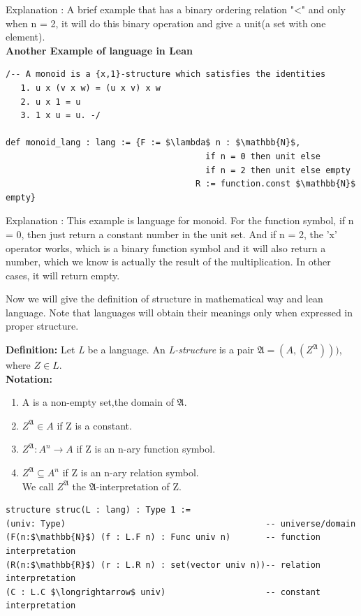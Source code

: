 \documentclass[landscape]{sciposter}
\begin{document}
\begin{multicols}{4}
Explanation : A brief example that has a binary ordering relation "<" and only when n = 2, it will do this binary operation and give a unit(a set with one element).\\

\textbf{Another Example of language in Lean}\\
\begin{lstlisting}
/-- A monoid is a {x,1}-structure which satisfies the identities
   1. u x (v x w) = (u x v) x w
   2. u x 1 = u
   3. 1 x u = u. -/

def monoid_lang : lang := {F := $\lambda$ n : $\mathbb{N}$,
                                        if n = 0 then unit else
                                        if n = 2 then unit else empty
                                      R := function.const $\mathbb{N}$ empty}
\end{lstlisting}
Explanation : This example is language for monoid.  For the function symbol, if n = 0, then just return a constant number in the unit set. And if n = 2, the 'x' operator works, which is a binary function symbol and it will also return a number, which we know is actually the result of the multiplication. In other cases, it will return empty.


Now we will give the definition of structure in mathematical way and
lean language. Note that languages will obtain their meanings only
when expressed in proper structure.

\textbf{Definition:} Let \textit{L} be a language. An \textit{L-structure} is a pair $\mathfrak{A} = (A,(Z^\mathfrak{A})))$, where $Z \in L$. \\
\textbf{Notation:} \begin{enumerate}
    \item    A is a non-empty set,the domain of $\mathfrak{A}$.
    \item    $Z^\mathfrak{A}\in A$ if Z is a constant.
    \item    $Z^\mathfrak{A} : A^n \longrightarrow A$ if Z is an n-ary function symbol.
    \item    $Z^\mathfrak{A} \subseteq A^n$ if Z is an n-ary relation symbol.\\
    We call $Z^\mathfrak{A}$ the $\mathfrak{A}$-interpretation of Z.
\end{enumerate}

\begin{lstlisting}
structure struc(L : lang) : Type 1 :=
(univ: Type)                                        -- universe/domain
(F(n:$\mathbb{N}$) (f : L.F n) : Func univ n)       -- function interpretation
(R(n:$\mathbb{R}$) (r : L.R n) : set(vector univ n))-- relation interpretation
(C : L.C $\longrightarrow$ univ)                    -- constant interpretation
\end{lstlisting}


\end{multicols}
\end{document}
